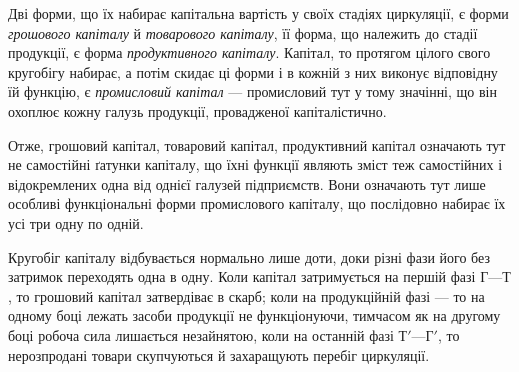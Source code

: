 
Дві форми, що їх набирає капітальна вартість у своїх стадіях циркуляції,
є форми \emph{грошового капіталу} й \emph{товарового капіталу}, її форма,
що належить до стадії продукції, є форма \emph{продуктивного капіталу}.
Капітал, то протягом цілого свого кругобігу набирає, а потім скидає ці
форми і в кожній з них виконує відповідну їй функцію, є \emph{промисловий
капітал} — промисловий тут у тому значінні, що він охоплює кожну
галузь продукції, провадженої капіталістично.

Отже, грошовий капітал, товаровий капітал, продуктивний капітал
означають тут не самостійні ґатунки капіталу, що їхні функції являють
зміст теж самостійних і відокремлених одна від однієї галузей підприємств.
Вони означають тут лише особливі функціональні форми промислового
капіталу, що послідовно набирає їх усі три одну по одній.

Кругобіг капіталу відбувається нормально лише доти, доки різні фази
його без затримок переходять одна в одну. Коли капітал затримується
на першій фазі $Г — Т$, то грошовий капітал затвердіває в скарб;
коли на продукційній фазі — то на одному боці лежать засоби продукції
не функціонуючи, тимчасом як на другому боці робоча сила лишається
незайнятою, коли на останній фазі $Т' — Г'$, то нерозпродані товари
скупчуються й захаращують перебіг циркуляції.

